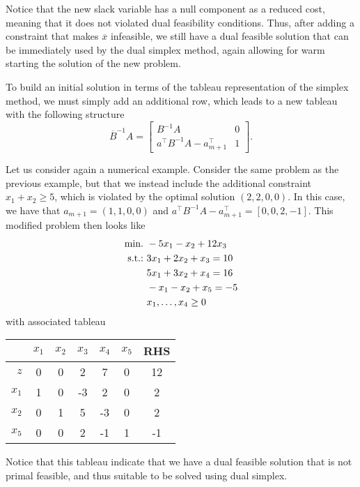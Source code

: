 Notice that the new slack variable has a null component as a reduced cost, meaning that it does not violated dual feasibility conditions. Thus, after adding a constraint that makes $\overline{x}$ infeasible, we still have a dual feasible solution that can be immediately used by the dual simplex method, again allowing for warm starting the solution of the new problem.

To build an initial solution in terms of the tableau representation of the simplex method, we must simply add an additional row, which leads to a new tableau with the following structure
%
\begin{equation*}
	\overline{B}^{-1}A = \begin{bmatrix} B^{-1}A & 0 \\ a^\top B^{-1}A - a_{m+1}^\top & 1 \end{bmatrix}.
\end{equation*}
%		

Let us consider again a numerical example. Consider the same problem as the previous example, but that we instead include the additional constraint $x_1 + x_2 \geq 5$, which is violated by the optimal solution $(2,2,0,0)$. In this case, we have that $a_{m+1} = (1,1,0,0)$ and $a^\top B^{-1} A - a^\top_{m+1} = [0, 0, 2, -1]$. This modified problem then looks like
%
\begin{align*}
	\mathop{\text{min.~}} & -5x_1 -x_2 + 12 x_3 \\
	\mathop{\text{s.t.:~}}   & 3x_1 + 2x_2 + x_3  = 10 \\
	& 5x_1 + 3x_2 + x_4 = 16 \\
	& -x_1 - x_2 + x_5 = -5  \\
	& x_1, \dots, x_4 \geq 0
\end{align*}
%
with associated tableau

\begin{center}
	\begin{tabular}{r|ccccc|c} 
	   &$x_1$ & $x_2$ & $x_3$ & $x_4$ & $x_5$ & RHS \\ \hline	
	   $z$ & 0 & 0 & 2 & 7 & 0 & 12                 \\ \hline
	   $x_1$ & 1 & 0 & -3 & 2 & 0 & 2 				\\
	   $x_2$ & 0 & 1 & 5 & -3 & 0 & 2 				\\
	   $x_5$ &  0 &  0 &  2 & -1 & 1 & -1           
	\end{tabular}
\end{center}

Notice that this tableau indicate that we have a dual feasible solution that is not primal feasible, and thus suitable to be solved using dual simplex.
	
